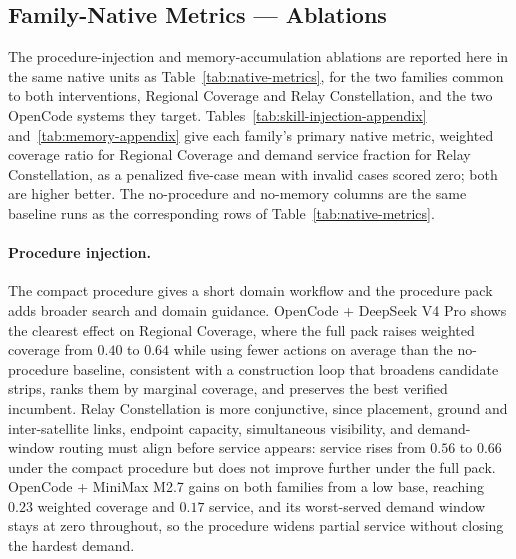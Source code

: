 \documentclass[11pt]{article}
\begin{document}
\subsection{Family-Native Metrics --- Ablations}

The procedure-injection and memory-accumulation ablations are reported here in the same native units as Table~\ref{tab:native-metrics}, for the two families common to both interventions, Regional Coverage and Relay Constellation, and the two OpenCode systems they target. Tables~\ref{tab:skill-injection-appendix} and~\ref{tab:memory-appendix} give each family's primary native metric, weighted coverage ratio for Regional Coverage and demand service fraction for Relay Constellation, as a penalized five-case mean with invalid cases scored zero; both are higher better. The no-procedure and no-memory columns are the same baseline runs as the corresponding rows of Table~\ref{tab:native-metrics}.

\paragraph{Procedure injection.}
The compact procedure gives a short domain workflow and the procedure pack adds broader search and domain guidance. OpenCode + DeepSeek V4 Pro shows the clearest effect on Regional Coverage, where the full pack raises weighted coverage from $0.40$ to $0.64$ while using fewer actions on average than the no-procedure baseline, consistent with a construction loop that broadens candidate strips, ranks them by marginal coverage, and preserves the best verified incumbent. Relay Constellation is more conjunctive, since placement, ground and inter-satellite links, endpoint capacity, simultaneous visibility, and demand-window routing must align before service appears: service rises from $0.56$ to $0.66$ under the compact procedure but does not improve further under the full pack. OpenCode + MiniMax M2.7 gains on both families from a low base, reaching $0.23$ weighted coverage and $0.17$ service, and its worst-served demand window stays at zero throughout, so the procedure widens partial service without closing the hardest demand.
\end{document}
